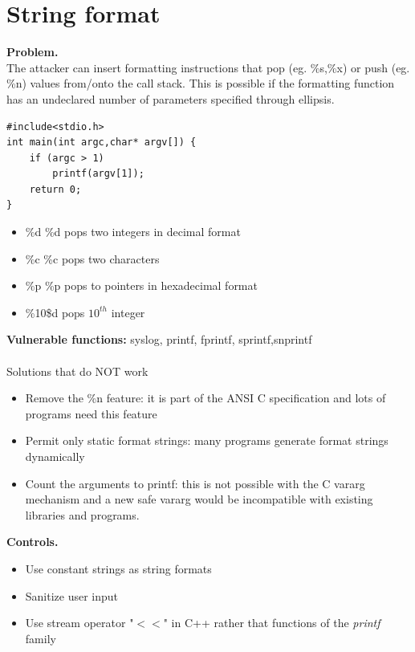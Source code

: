 \documentclass[10pt,a4paper]{article}
\begin{document}
\section{String format}
\textbf{Problem.} \\
The attacker can insert formatting instructions that pop (eg. \%s,\%x) or push (eg. \%n) values from/onto the call stack. This is possible if the formatting function has an undeclared number of parameters specified through ellipsis.
\begin{verbatim}
#include<stdio.h>
int main(int argc,char* argv[]) {
	if (argc > 1)
		printf(argv[1]);
	return 0;
}
\end{verbatim}
\begin{itemize}
\item \%d \%d pops two integers in decimal format
\item \%c \%c pops two characters
\item \%p \%p pops to pointers in hexadecimal format
\item \%10\$d pops $10^{th}$ integer
\end{itemize}
\textbf{Vulnerable functions:} syslog, printf, fprintf, sprintf,snprintf\\\\
Solutions that do NOT work
\begin{itemize}
\item Remove the \%n feature: it is part of the ANSI C specification and lots of programs need this feature
\item Permit only static format strings: many programs generate format strings dynamically
\item Count the arguments to printf: this is not possible with the C vararg mechanism and a new safe vararg would be incompatible with existing libraries and programs.
\end{itemize}
\textbf{Controls.} 
\begin{itemize}
\item Use constant strings as string formats
\item Sanitize user input
\item Use stream operator "$<<$" in C++ rather that functions of the \emph{printf} family
\end{itemize}
\newpage
\end{document}
